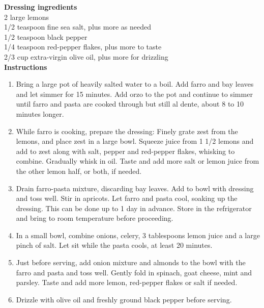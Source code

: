 \documentclass{article}
\numberwithin{figure}{section}
\numberwithin{equation}{section}
\begin{document}
{\bf Dressing ingredients}\\
2 large lemons\\
1/2 teaspoon fine sea salt, plus more as needed\\
1/2 teaspoon black pepper\\
1/4 teaspoon red-pepper flakes, plus more to taste\\
2/3 cup extra-virgin olive oil, plus more for drizzling\\

{\bf Instructions}
\begin{enumerate}
\item Bring a large pot of heavily salted water to a boil. Add farro and bay leaves and let simmer for 15 minutes. Add orzo to the pot and continue to simmer until farro and pasta are cooked through but still al dente, about 8 to 10 minutes longer.
\item While farro is cooking, prepare the dressing: Finely grate zest from the lemons, and place zest in a large bowl. Squeeze juice from 1 1/2 lemons and add to zest along with salt, pepper and red-pepper flakes, whisking to combine. Gradually whisk in oil. Taste and add more salt or lemon juice from the other lemon half, or both, if needed.
\item Drain farro-pasta mixture, discarding bay leaves. Add to bowl with dressing and toss well. Stir in apricots. Let farro and pasta cool, soaking up the dressing. This can be done up to 1 day in advance. Store in the refrigerator and bring to room temperature before proceeding.
\item In a small bowl, combine onions, celery, 3 tablespoons lemon juice and a large pinch of salt. Let sit while the pasta cools, at least 20 minutes.
\item Just before serving, add onion mixture and almonds to the bowl with the farro and pasta and toss well. Gently fold in spinach, goat cheese, mint and parsley. Taste and add more lemon, red-pepper flakes or salt if needed.
\item Drizzle with olive oil and freshly ground black pepper before serving.
\end{enumerate}

\pagebreak
\end{document}
